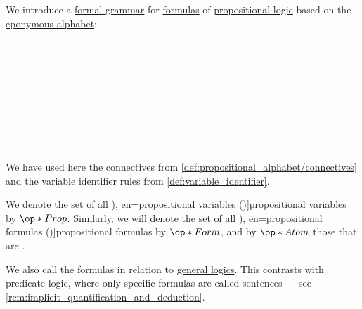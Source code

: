 \begin{definition}\label{def:propositional_formula}\mimprovised
  We introduce a \hyperref[def:formal_grammar]{formal grammar} for \hyperref[con:proposition]{formulas} of \hyperref[def:propositional_logic]{propositional logic} based on the \hyperref[def:propositional_alphabet]{eponymous alphabet}:
  \begin{longbnf*}
     {} \\
           {\bnftsq{\( \syntop \)} \bnfor \bnftsq{\( \synbot \)}} \\
             { \bnfor {}} \\
           {\bnftsq{\( \synneg \)} \bnfsp {}} \\
         {\bnftsq{(} \bnfsp {} \bnfsp {} \bnfsp {} \bnfsp \bnftsq{)}} \\
                    { \bnfor} \\
     \\
     \\
  \end{longbnf*}

  We have used here the connectives from \cref{def:propositional_alphabet/connectives} and the variable identifier rules from \cref{def:variable_identifier}.

  We denote the set of all \term[ru=пропозициональные переменные (\cite[43]{КолмогоровДрагалин2006ЛогикаВведение}), en=propositional variables (\cite[27]{Church1956LogicVol1})]{propositional variables} by \( \op*{Prop} \). Similarly, we will denote the set of all \term[ru=формулы (\cite[43]{КолмогоровДрагалин2006ЛогикаВведение}), en=propositional formulas (\cite[41]{Mimram2020ProgramEqualsProof})]{propositional formulas} by \( \op*{Form} \), and by \( \op*{Atom} \) those that are .

  We also call the formulas  in relation to \hyperref[def:general_logic]{general logics}. This contrasts with predicate logic, where only specific formulas are called sentences --- see \cref{rem:implicit_quantification_and_deduction}.
\end{definition}
